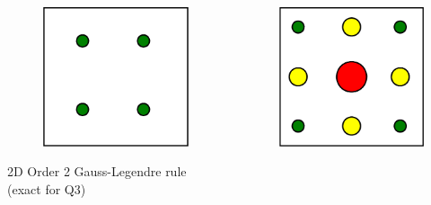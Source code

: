 \documentclass[8pt,xcolor=svgnames]{beamer}
\begin{document}
\begin{frame}
\begin{columns}[T]
\begin{column}{0.2\textwidth}
\begin{figure}[h!]
      \includegraphics[width=1.0\textwidth,keepaspectratio=true]{./Images/quad2.png}
      \end{figure}
      \centering
      \tiny{2D Order 2
	Gauss-Legendre rule
	(exact for Q3)}
  \end{column}
  \begin{column}{0.2\textwidth}
    \begin{figure}[h!]
      \centering
      \includegraphics[width=1.0\textwidth,keepaspectratio=true]{./Images/quad3.png}

\end{figure}
\end{column}
\end{columns}
\end{frame}
\end{document}
